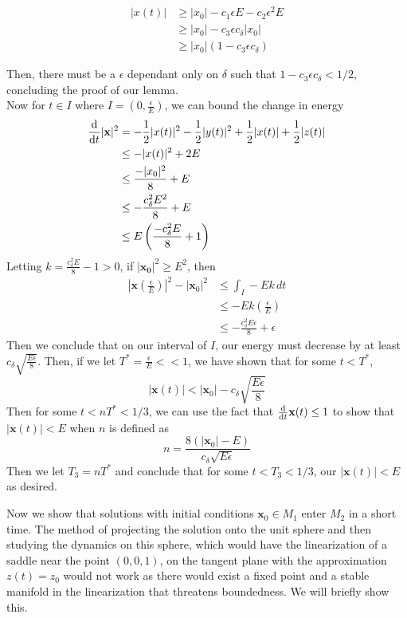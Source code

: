 \documentclass[11pt]{article}
\begin{document}
 \begin{align*}
    |x(t)| &\geq |x_0| - c_1\epsilon E - c_2 \epsilon^2 E\\
    &\geq |x_0| - c_3\epsilon c_\delta |x_0|\\
    & \geq |x_0|(1 - c_3 \epsilon c_{\delta})
 \end{align*}

Then, there must be a $\epsilon$ dependant only on $\delta$ such that $1 - c_3 \epsilon c_{\delta} < 1/2$, concluding the proof of our lemma. \\

Now for $t \in I$ where $I = (0, \frac{\epsilon}{E})$, we can bound the change in energy
\begin{align*}
    \dv{}{t}|\mathbf{x}|^2 &= -\frac{1}{2}|x(t)|^2 - \frac{1}{2}|y(t)|^2 + \frac{1}{2}|x(t)| + \frac{1}{2}|z(t)|\\
    &\leq -|x(t)|^2 + 2E\\
    & \leq \frac{-|x_0|^2}{8} + E\\
    & \leq -\frac{c_{\delta}^2E^2}{8} + E\\
    &\leq E\left(\frac{-c_{\delta}^2E}{8} + 1\right)
\end{align*}
Letting $k = \frac{c_{\delta}^2E}{8} - 1 > 0$, if $|\mathbf{x_0}|^2 \geq E^2$, then  
\begin{align*}
    \left|\mathbf{x}\left(\frac{\epsilon}{E}\right)\right|^2 - |\mathbf{x}_0|^2 &\leq \int_I -Ek \, dt \\
    &\leq -Ek (\frac{\epsilon}{E}) \\
    &\leq -\frac{c_{\delta}^2E\epsilon}{8} + \epsilon 
\end{align*}
Then we conclude that on our interval of $I$, our energy must decrease by at least $c_{\delta}\sqrt{\frac{E\epsilon}{8}}$. Then, if we let $T^* = \frac{\epsilon}{E} << 1$, we have shown that for some $t < T^*$, $$|\mathbf{x}(t)| < |\mathbf{x}_0| - c_{\delta}\sqrt{\frac{E\epsilon}{8}}$$ Then for some $t < nT^* < 1/3$, we can use the fact that $\dv{}{t}\mathbf{x}(t) \leq 1$ to show that $|\mathbf{x}(t)| < E$ when $n$ is defined as $$n = \frac{8(|\mathbf{x}_0| - E)}{c_{\delta}\sqrt{E\epsilon}}$$Then we let $T_3 = nT^*$ and conclude that for some $t < T_3 < 1/3$, our $|\mathbf{x}(t)| < E$ as desired. 

Now we show that solutions with initial conditions $\mathbf{x}_0 \in M_1$ enter $M_2$ in a short time. The method of projecting the solution onto the unit sphere and then studying the dynamics on this sphere, which would have the linearization of a saddle near the point $(0, 0, 1)$, on the tangent plane with the approximation $z(t) = z_0$ would not work as there would exist a fixed point and a stable manifold in the linearization that threatens boundedness. We will briefly show this. 
\end{document}
